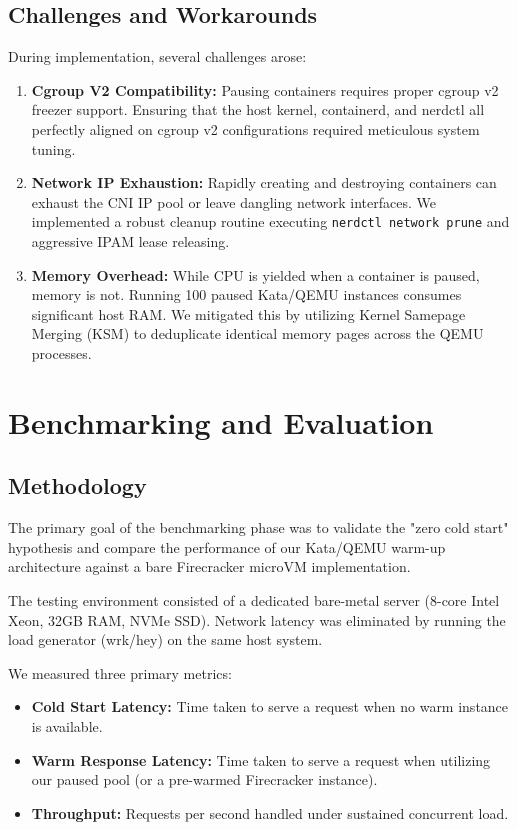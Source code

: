 \documentclass[12pt,a4paper]{report}
\begin{document}
\section{Challenges and Workarounds}
During implementation, several challenges arose:
\begin{enumerate}
    \item \textbf{Cgroup V2 Compatibility:} Pausing containers requires proper cgroup v2 freezer support. Ensuring that the host kernel, containerd, and nerdctl all perfectly aligned on cgroup v2 configurations required meticulous system tuning.
    \item \textbf{Network IP Exhaustion:} Rapidly creating and destroying containers can exhaust the CNI IP pool or leave dangling network interfaces. We implemented a robust cleanup routine executing \texttt{nerdctl network prune} and aggressive IPAM lease releasing.
    \item \textbf{Memory Overhead:} While CPU is yielded when a container is paused, memory is not. Running 100 paused Kata/QEMU instances consumes significant host RAM. We mitigated this by utilizing Kernel Samepage Merging (KSM) to deduplicate identical memory pages across the QEMU processes.
\end{enumerate}

\chapter{Benchmarking and Evaluation}

\section{Methodology}
The primary goal of the benchmarking phase was to validate the "zero cold start" hypothesis and compare the performance of our Kata/QEMU warm-up architecture against a bare Firecracker microVM implementation.

The testing environment consisted of a dedicated bare-metal server (8-core Intel Xeon, 32GB RAM, NVMe SSD). Network latency was eliminated by running the load generator (wrk/hey) on the same host system.

We measured three primary metrics:
\begin{itemize}
    \item \textbf{Cold Start Latency:} Time taken to serve a request when no warm instance is available.
    \item \textbf{Warm Response Latency:} Time taken to serve a request when utilizing our paused pool (or a pre-warmed Firecracker instance).
    \item \textbf{Throughput:} Requests per second handled under sustained concurrent load.
\end{itemize}
\end{document}

